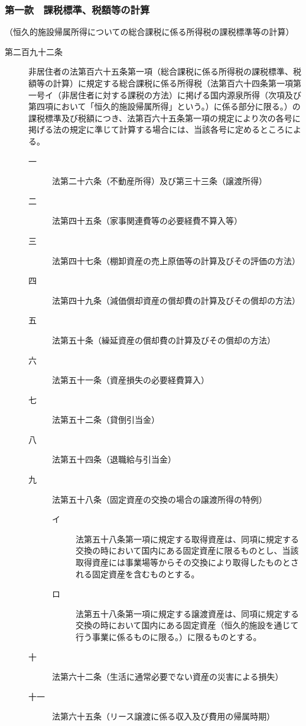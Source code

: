 \documentclass[twocolumn,a4j,10pt]{ltjtarticle}
\begin{document}
\subsubsection*{第一款　課税標準、税額等の計算}
\noindent\hspace{10pt}（恒久的施設帰属所得についての総合課税に係る所得税の課税標準等の計算）
\begin{description}
\item[第二百九十二条]非居住者の法第百六十五条第一項（総合課税に係る所得税の課税標準、税額等の計算）に規定する総合課税に係る所得税（法第百六十四条第一項第一号イ（非居住者に対する課税の方法）に掲げる国内源泉所得（次項及び第四項において「恒久的施設帰属所得」という。）に係る部分に限る。）の課税標準及び税額につき、法第百六十五条第一項の規定により次の各号に掲げる法の規定に準じて計算する場合には、当該各号に定めるところによる。
\begin{description}
\item[一]法第二十六条（不動産所得）及び第三十三条（譲渡所得）
\item[二]法第四十五条（家事関連費等の必要経費不算入等）
\item[三]法第四十七条（棚卸資産の売上原価等の計算及びその評価の方法）
\item[四]法第四十九条（減価償却資産の償却費の計算及びその償却の方法）
\item[五]法第五十条（繰延資産の償却費の計算及びその償却の方法）
\item[六]法第五十一条（資産損失の必要経費算入）
\item[七]法第五十二条（貸倒引当金）
\item[八]法第五十四条（退職給与引当金）
\item[九]法第五十八条（固定資産の交換の場合の譲渡所得の特例）
\begin{description}
\item[イ]法第五十八条第一項に規定する取得資産は、同項に規定する交換の時において国内にある固定資産に限るものとし、当該取得資産には事業場等からその交換により取得したものとされる固定資産を含むものとする。
\item[ロ]法第五十八条第一項に規定する譲渡資産は、同項に規定する交換の時において国内にある固定資産（恒久的施設を通じて行う事業に係るものに限る。）に限るものとする。
\end{description}
\item[十]法第六十二条（生活に通常必要でない資産の災害による損失）
\item[十一]法第六十五条（リース譲渡に係る収入及び費用の帰属時期）

\end{description}
\end{description}
\end{document}
